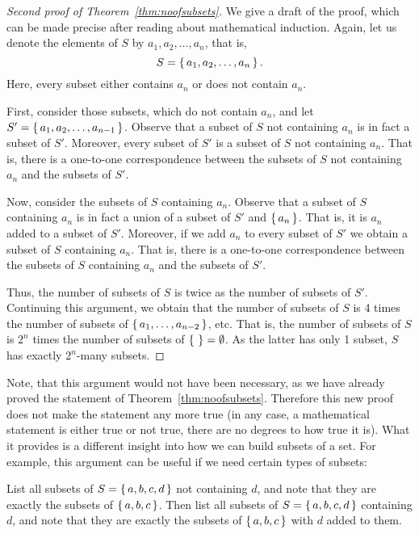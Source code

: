 \begin{proof}[Second proof of Theorem~\ref{thm:noofsubsets}]
We give a draft of the proof, which can be made precise after reading about mathematical induction. 
Again, let us denote the elements of $S$ by $a_1, a_2, \dots , a_n$, 
that is, 
\[
S = \left\{\,a_1, a_2, \dots , a_n\,\right\}. 
\]
Here, every subset either contains $a_n$ or does not contain $a_n$. 

First, consider those subsets, which do not contain $a_n$, 
and let $S' = \left\{\,a_1, a_2, \dots, a_{n-1}\,\right\}$. 
Observe that a subset of $S$ not containing $a_n$ is in fact a subset of $S'$. 
Moreover, every subset of $S'$ is a subset of $S$ not containing $a_n$. 
That is, there is a one-to-one correspondence between the subsets of $S$ not containing $a_n$ and the subsets of $S'$. 

Now, consider the subsets of $S$ containing $a_n$. 
Observe that a subset of $S$ containing $a_n$ is in fact a union of a subset of $S'$ and $\left\{\,a_n\,\right\}$. 
That is, it is $a_n$ added to a subset of $S'$. 
Moreover, if we add $a_n$ to every subset of $S'$ we obtain a subset of $S$ containing $a_n$. 
That is, there is a one-to-one correspondence between the subsets of $S$ containing $a_n$ and the subsets of $S'$. 

Thus, the number of subsets of $S$ is twice as the number of subsets of $S'$. 
Continuing this argument, 
we obtain that the number of subsets of $S$ is 4 times the number of subsets of $\left\{\,a_1, \dots , a_{n-2}\,\right\}$, etc. 
That is, the number of subsets of $S$ is $2^n$ times the number of subsets of $\left\{\,\,\right\} = \emptyset$. 
As the latter has only 1 subset, $S$ has exactly $2^n$-many subsets. 
\end{proof}

Note, that this argument would not have been necessary, 
as we have already proved the statement of Theorem~\ref{thm:noofsubsets}. 
Therefore this new proof does not make the statement any more true 
(in any case, a mathematical statement is either true or not true, there are no degrees to how true it is). 
What it provides is a different insight into how we can build subsets of a set. 
For example, this argument can be useful if we need certain types of subsets: 

\begin{exercise}\label{ex:subsetabcd}
List all subsets of $S = \left\{\,a, b, c, d\,\right\}$ not containing $d$, 
and note that they are exactly the subsets of $\left\{\,a, b, c\,\right\}$. 
Then list all subsets of $S = \left\{\,a, b, c, d\,\right\}$ containing $d$, 
and note that they are exactly the subsets of $\left\{\,a, b, c\,\right\}$ with $d$ added to them. 
\end{exercise}

